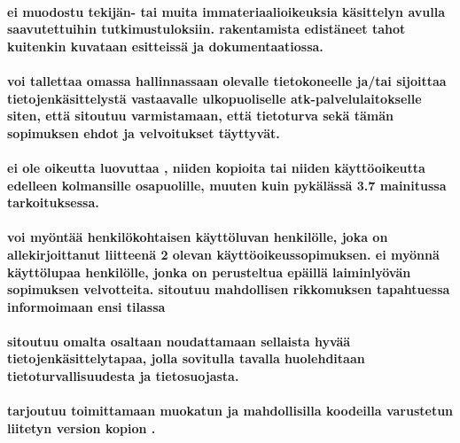 \documentclass[a4paper,finnish]{article}
\begin{document}
\paragraph{ ei muodostu tekijän- tai muita
immateriaalioikeuksia  käsittelyn avulla saavutettuihin
tutkimustuloksiin.  rakentamista edistäneet tahot
kuitenkin kuvataan  esitteissä ja dokumentaatiossa.}

\paragraph{ voi tallettaa 
omassa hallinnassaan olevalle tietokoneelle ja/tai sijoittaa 
tietojenkäsittelystä vastaavalle ulkopuoliselle atk-palvelulaitokselle
siten, että  sitoutuu varmistamaan, että
 tietoturva sekä tämän sopimuksen ehdot ja
velvoitukset täyttyvät.} 

\paragraph{ ei ole oikeutta luovuttaa
, niiden kopioita tai niiden käyttöoikeutta edelleen
kolmansille osapuolille, muuten kuin pykälässä 3.7 mainitussa tarkoituksessa.}

\paragraph{ voi myöntää 
henkilökohtaisen käyttöluvan henkilölle, joka on allekirjoittanut
liitteenä 2 olevan käyttöoikeussopimuksen. 
ei myönnä  käyttölupaa henkilölle, jonka on perusteltua
epäillä laiminlyövän sopimuksen velvotteita. 
sitoutuu mahdollisen rikkomuksen tapahtuessa informoimaan ensi tilassa
}

\paragraph{ sitoutuu omalta osaltaan noudattamaan
sellaista hyvää tietojenkäsittelytapaa, jolla sovitulla tavalla
huolehditaan tietoturvallisuudesta ja tietosuojasta.}

\paragraph{ tarjoutuu toimittamaan
 muokatun ja mahdollisilla koodeilla varustetun
 liitetyn version kopion .}
\end{document}
